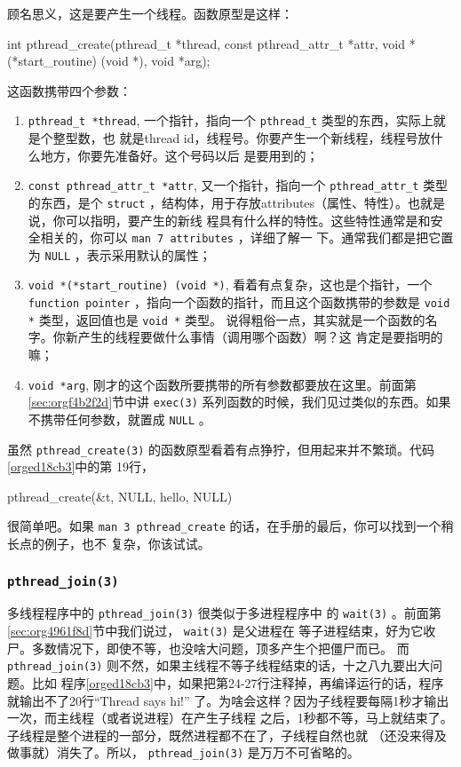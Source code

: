 \documentclass{wx672ctexart}
\newcommand\mpic[1]{%
  \marginpar{\texttt{[image: thumbnails/\#1]}}}
\begin{document}
顾名思义，这是要产生一个线程。函数原型是这样：
\begin{ccode}
int pthread_create(pthread_t *thread, const pthread_attr_t *attr, void *(*start_routine) (void *), void *arg);
\end{ccode}
这函数携带四个参数：
\begin{enumerate}
\item \texttt{pthread\_t *thread}, 一个指针，指向一个 \texttt{pthread\_t} 类型的东西，实际上就是个整型数，也
就是thread id，线程号。你要产生一个新线程，线程号放什么地方，你要先准备好。这个号码以后
是要用到的；
\item \texttt{const pthread\_attr\_t *attr}, 又一个指针，指向一个 \texttt{pthread\_attr\_t} 类型的东西，是个
\texttt{struct} ，结构体，用于存放attributes（属性、特性）。也就是说，你可以指明，要产生的新线
程具有什么样的特性。这些特性通常是和安全相关的，你可以 \texttt{man 7 attributes} ，详细了解一
下。通常我们都是把它置为 \texttt{NULL} ，表示采用默认的属性；
\item \texttt{void *(*start\_routine) (void *)}, 看着有点复杂，这也是个指针，一个 \texttt{function pointer}
，指向一个函数的指针，而且这个函数携带的参数是 \texttt{void *} 类型，返回值也是 \texttt{void *} 类型。
说得粗俗一点，其实就是一个函数的名字。你新产生的线程要做什么事情（调用哪个函数）啊？这
肯定是要指明的嘛；
\item \texttt{void *arg}, 刚才的这个函数所要携带的所有参数都要放在这里。前面第\ref{sec:orgf4b2f2d}节中讲 \texttt{exec(3)}
系列函数的时候，我们见过类似的东西。如果不携带任何参数，就置成 \texttt{NULL} 。
\end{enumerate}

虽然 \texttt{pthread\_create(3)} 的函数原型看着有点狰狞，但用起来并不繁琐。代码\ref{orged18cb3}中的第
19行，
\begin{ccode}
pthread_create(&t, NULL, hello, NULL)
\end{ccode}
很简单吧。如果 \texttt{man 3 pthread\_create} 的话，在手册的最后，你可以找到一个稍长点的例子，也不
复杂，你该试试。

\subsubsection{\texttt{pthread\_join(3)}}
\label{sec:orgddafdfd}

\mpic{pg_0081}多线程程序中的 \texttt{pthread\_join(3)} 很类似于多进程程序中
的 \texttt{wait(3)} 。前面第\ref{sec:org4961f8d}节中我们说过， \texttt{wait(3)} 是父进程在
等子进程结束，好为它收尸。多数情况下，即使不等，也没啥大问题，顶多产生个把僵尸而已。
而 \texttt{pthread\_join(3)} 则不然，如果主线程不等子线程结束的话，十之八九要出大问题。比如
程序\ref{orged18cb3}中，如果把第24-27行注释掉，再编译运行的话，程序就输出不了20行“Thread
says hi!” 了。为啥会这样？因为子线程要每隔1秒才输出一次，而主线程（或者说进程）在产生子线程
之后，1秒都不等，马上就结束了。子线程是整个进程的一部分，既然进程都不在了，子线程自然也就
（还没来得及做事就）消失了。所以， \texttt{pthread\_join(3)} 是万万不可省略的。
\end{document}
